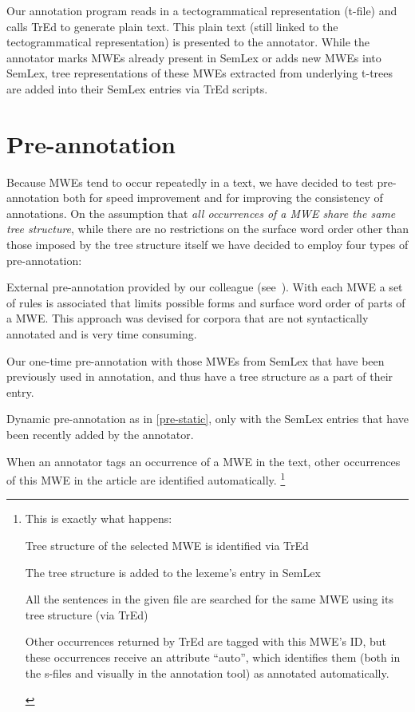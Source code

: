Our annotation program reads in a tectogrammatical representation (t-file) and calls TrEd \citep{pajas:tred} to generate plain text. This plain text (still linked to the tectogrammatical representation) is presented to the annotator. While the annotator marks MWEs already present in SemLex or adds new MWEs into SemLex, tree representations of these MWEs extracted from underlying t-trees are added into their SemLex entries via TrEd scripts. 



\section{Pre-annotation}
\label{sec:annot:pre}
Because MWEs tend to occur repeatedly in a text, we have decided to test pre-annotation both for speed improvement and for improving the consistency of annotations. 
On the assumption that \emph{all occurrences of a MWE share the same tree structure}, while there are no restrictions on the surface word order other than those imposed by the tree structure itself
%
we have decided to employ four types of pre-annotation:

\begin{asparaenum}[A)]
\item \label{pre-hnatkova}External pre-annotation provided by our colleague (see~\citealp{hnatkova:2002}). With each MWE a set of rules is associated that limits possible forms and surface word order of parts of a MWE. This approach was devised for corpora that are not syntactically annotated and is very time consuming.
\item \label{pre-static}Our one-time pre-annotation with those MWEs from SemLex that have been previously used in annotation, and thus have a tree structure as a part of their entry.
\item \label{pre-on-load}Dynamic pre-annotation as in \ref{pre-static}, only with the SemLex entries that have been recently added by the annotator. 
\item \label{pre-on-annot}When an annotator tags an occurrence of a MWE in the text, other occurrences of this MWE in the article are identified automatically.%
%
\footnote{This is exactly what happens:
\begin{inparaenum}[1)]
\item Tree structure of the selected MWE is identified via TrEd
\item The tree structure is added to the lexeme's entry in SemLex
\item All the sentences in the given file are searched for the same MWE using its tree structure (via TrEd)
\item Other occurrences returned by TrEd are tagged with this MWE's ID, but these occurrences receive an attribute ``auto'', which identifies them (both in the s-files and visually in the annotation tool) as annotated automatically.
\end{inparaenum}
} %
\end{asparaenum}

